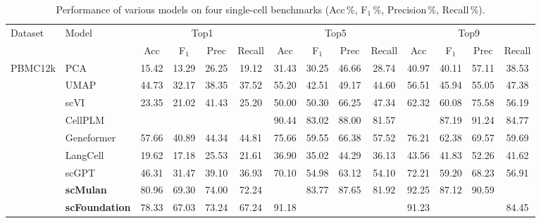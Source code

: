 \begin{table}[htbp]

  \centering

  \scriptsize

  \caption{Performance of various models on four single-cell benchmarks (Acc\,\%, F$_1$\,\%, Precision\,\%, Recall\,\%).}

  \label{tab:performance_acc_f1_precision_recall_all}

  \setlength{\tabcolsep}{4pt}

  \begin{tabular}{llcccccccccccc}

    \toprule
    Dataset   & Model
      & \multicolumn{4}{c}{Top1}    & \multicolumn{4}{c}{Top5}
      & \multicolumn{4}{c}{Top9}    \\
    \cmidrule(lr){3-6}\cmidrule(lr){7-10}\cmidrule(lr){11-14}
              & 
      & Acc    & F$_1$    & Prec    & Recall
      & Acc    & F$_1$    & Prec    & Recall
      & Acc    & F$_1$    & Prec    & Recall   \\
    \midrule

    \multirow{9}{*}{PBMC12k}

      & PCA      &   15.42 &   13.29 &   26.25 &   19.12 &   31.43 &   30.25 &   46.66 &   28.74 &   40.97 &   40.11 &   57.11 &   38.53  \\
      & UMAP      &   44.73 &   32.17 &   38.35 &   37.52 &   55.20 &   42.51 &   49.17 &   44.60 &   56.51 &   45.94 &   55.05 &   47.38  \\
      & scVI      &   23.35 &   21.02 &   41.43 &   25.20 &   50.00 &   50.30 &   66.25 &   47.34 &   62.32 &   60.08 &   75.58 &   56.19  \\
      & CellPLM      & \cellcolor{gray!25}{81.79} & \cellcolor{gray!25}{71.95} & \cellcolor{gray!25}{75.35} & \cellcolor{gray!25}{73.04} &   90.44 &   83.02 &   88.00 &   81.57 & \cellcolor{gray!25}{93.04} &   87.19 &   91.24 &   84.77  \\
      & Geneformer      &   57.66 &   40.89 &   44.34 &   44.81 &   75.66 &   59.55 &   66.38 &   57.52 &   76.21 &   62.38 &   69.57 &   59.69  \\
      & LangCell      &   19.62 &   17.18 &   25.53 &   21.61 &   36.90 &   35.02 &   44.29 &   36.13 &   43.56 &   41.83 &   52.26 &   41.62  \\
      & scGPT      &   46.31 &   31.47 &   39.10 &   36.93 &   70.10 &   54.98 &   63.12 &   54.10 &   72.21 &   59.20 &   68.23 &   56.91  \\
      & \cellcolor{gray!25}\textbf{scMulan}      &   80.96 &   69.30 &   74.00 &   72.24 & \cellcolor{gray!25}{91.48} &   83.77 &   87.65 &   81.92 &   92.25 &   87.12 &   90.59 & \cellcolor{gray!25}{84.98}  \\
      & \cellcolor{gray!25}\textbf{scFoundation}      &   78.33 &   67.03 &   73.24 &   67.24 &   91.18 & \cellcolor{gray!25}{85.50} & \cellcolor{gray!25}{89.18} & \cellcolor{gray!25}{83.16} &   91.23 & \cellcolor{gray!25}{87.29} & \cellcolor{gray!25}{91.75} &   84.45  \\
    \midrule


\end{tabular}
\end{table}
